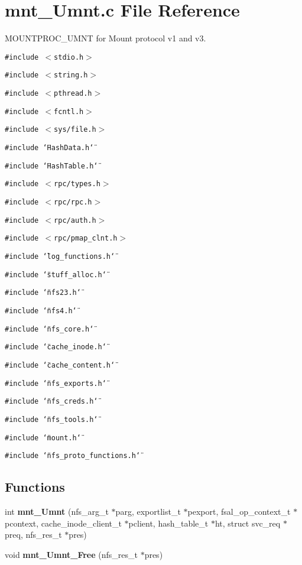 \section{mnt\_\-Umnt.c File Reference}
\label{mnt__Umnt_8c}
MOUNTPROC\_\-UMNT for Mount protocol v1 and v3. 

{\tt \#include $<$stdio.h$>$}\par
{\tt \#include $<$string.h$>$}\par
{\tt \#include $<$pthread.h$>$}\par
{\tt \#include $<$fcntl.h$>$}\par
{\tt \#include $<$sys/file.h$>$}\par
{\tt \#include \char`\"{}Hash\-Data.h\char`\"{}}\par
{\tt \#include \char`\"{}Hash\-Table.h\char`\"{}}\par
{\tt \#include $<$rpc/types.h$>$}\par
{\tt \#include $<$rpc/rpc.h$>$}\par
{\tt \#include $<$rpc/auth.h$>$}\par
{\tt \#include $<$rpc/pmap\_\-clnt.h$>$}\par
{\tt \#include \char`\"{}log\_\-functions.h\char`\"{}}\par
{\tt \#include \char`\"{}stuff\_\-alloc.h\char`\"{}}\par
{\tt \#include \char`\"{}nfs23.h\char`\"{}}\par
{\tt \#include \char`\"{}nfs4.h\char`\"{}}\par
{\tt \#include \char`\"{}nfs\_\-core.h\char`\"{}}\par
{\tt \#include \char`\"{}cache\_\-inode.h\char`\"{}}\par
{\tt \#include \char`\"{}cache\_\-content.h\char`\"{}}\par
{\tt \#include \char`\"{}nfs\_\-exports.h\char`\"{}}\par
{\tt \#include \char`\"{}nfs\_\-creds.h\char`\"{}}\par
{\tt \#include \char`\"{}nfs\_\-tools.h\char`\"{}}\par
{\tt \#include \char`\"{}mount.h\char`\"{}}\par
{\tt \#include \char`\"{}nfs\_\-proto\_\-functions.h\char`\"{}}\par
\subsection*{Functions}
\begin{CompactItemize}
\item 
int {\bf mnt\_\-Umnt} (nfs\_\-arg\_\-t $\ast$parg, exportlist\_\-t $\ast$pexport, fsal\_\-op\_\-context\_\-t $\ast$pcontext, cache\_\-inode\_\-client\_\-t $\ast$pclient, hash\_\-table\_\-t $\ast$ht, struct svc\_\-req $\ast$preq, nfs\_\-res\_\-t $\ast$pres)
\item 
void {\bf mnt\_\-Umnt\_\-Free} (nfs\_\-res\_\-t $\ast$pres)
\end{CompactItemize}


